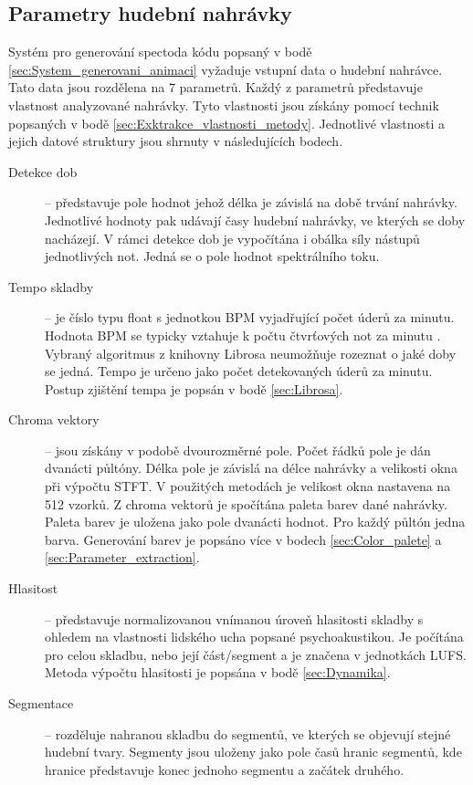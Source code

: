 \subsection{Parametry hudební nahrávky} \label{sec:Parametry_nahravky}
Systém pro generování spectoda kódu popsaný v bodě \ref{sec:System_generovani_animaci} vyžaduje vstupní data o hudební nahrávce. Tato data jsou rozdělena na 7 parametrů. Každý z parametrů představuje vlastnost analyzované nahrávky. Tyto vlastnosti jsou získány pomocí technik popsaných v bodě \ref{sec:Exktrakce_vlastnosti_metody}. Jednotlivé vlastnosti a jejich datové struktury jsou shrnuty v následujících bodech.

\begin{description}
    \item[Detekce dob] -- představuje pole hodnot jehož délka je závislá na době trvání nahrávky. Jednotlivé hodnoty pak udávají časy hudební nahrávky, ve kterých se doby nacházejí. V rámci detekce dob je vypočítána i obálka síly nástupů jednotlivých not. Jedná se o pole hodnot spektrálního toku. 
    
    \item[Tempo skladby] -- je číslo typu float s jednotkou \acs{BPM} vyjadřující počet úderů za minutu. Hodnota BPM se typicky vztahuje k počtu čtvrťových not za minutu \cite{Harvard_dictionary_of_music}. Vybraný algoritmus z knihovny Librosa neumožňuje rozeznat o jaké doby se jedná. Tempo je určeno jako počet detekovaných úderů za minutu. Postup zjištění tempa je popsán v bodě \ref{sec:Librosa}.

    \item[Chroma vektory] -- jsou získány v podobě dvourozměrné pole. Počet řádků pole je dán dvanácti půltóny. Délka pole je závislá na délce nahrávky a velikosti okna při výpočtu \acs{STFT}. V použitých metodách je velikost okna nastavena na 512 vzorků. Z chroma vektorů je spočítána paleta barev dané nahrávky. Paleta barev je uložena jako pole dvanácti hodnot. Pro každý půltón jedna barva. Generování barev je popsáno více v bodech \ref{sec:Color_palete} a \ref{sec:Parameter_extraction}.

    \item[Hlasitost] -- představuje normalizovanou vnímanou úroveň hlasitosti skladby s ohledem na vlastnosti lidského ucha popsané psychoakustikou. Je počítána pro celou skladbu, nebo její část/segment a je značena v jednotkách \acs{LUFS}. Metoda výpočtu hlasitosti je popsána v bodě \ref{sec:Dynamika}.

    \item[Segmentace] -- rozděluje nahranou skladbu do segmentů, ve kterých se objevují stejné hudební tvary. Segmenty jsou uloženy jako pole časů hranic segmentů, kde hranice představuje konec jednoho segmentu a začátek druhého. 


\end{description}
